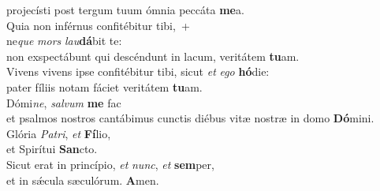 \evenverse projecísti post tergum tuum ómnia peccáta \textbf{me}a.\\
\oddverse Quia non inférnus confitébitur tibi,~+\\
\oddverse  ne\textit{que} \textit{mors} \textit{lau}\textbf{dá}bit te:~\*\\
\oddverse non exspectábunt qui descéndunt in lacum, veritátem \textbf{tu}am.\\
\evenverse Vivens vivens ipse confitébitur tibi, sicut \textit{et} \textit{e}\textit{go} \textbf{hó}die:~\*\\
\evenverse pater fíliis notam fáciet veritátem \textbf{tu}am.\\
\oddverse Dómi\textit{ne}, \textit{sal}\textit{vum} \textbf{me} fac~\*\\
\oddverse et psalmos nostros cantábimus cunctis diébus vitæ nostræ in domo \textbf{Dó}mini.\\
\evenverse Glória \textit{Pa}\textit{tri}, \textit{et} \textbf{Fí}lio,~\*\\
\evenverse et Spirítui \textbf{San}cto.\\
\oddverse Sicut erat in princípio, \textit{et} \textit{nunc}, \textit{et} \textbf{sem}per,~\*\\
\oddverse et in sǽcula sæculórum. \textbf{A}men.\\
